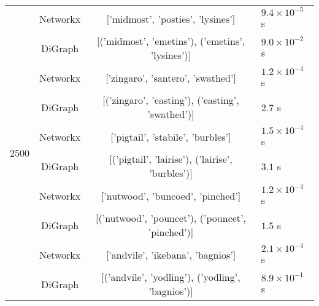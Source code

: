 \documentclass{article}[12 pt]
\begin{document}
\begin{center}
\begin{tabular}{ |c|c|c|l| }
			\multirow{10}{*}{2500} & Networkx & ['midmost', 'posties', 'lysines'] & $9.4\times 10^{-5}$ s\\
			& DiGraph & [('midmost', 'emetins'), ('emetins', 'lysines')] & $9.0\times 10^{-2}$ s\\
			& Networkx & ['zingaro', 'santero', 'swathed'] & $1.2\times 10^{-4}$ s\\
			& DiGraph & [('zingaro', 'easting'), ('easting', 'swathed')] & $2.7$ s\\
			& Networkx & ['pigtail', 'stabile', 'burbles'] & $1.5\times 10^{-4}$ s\\
			& DiGraph & [('pigtail', 'lairise'), ('lairise', 'burbles')] & $3.1$ s\\
			& Networkx & ['nutwood', 'buncoed', 'pinched'] & $1.2\times 10^{-4}$ s\\
			& DiGraph & [('nutwood', 'pouncet'), ('pouncet', 'pinched')] & $1.5$ s\\
			& Networkx & ['andvile', 'ikebana', 'bagnios'] & $2.1\times 10^{-4}$ s\\
			& DiGraph & [('andvile', 'yodling'), ('yodling', 'bagnios')] & $8.9\times 10^{-1}$ s\\
			\hline
		\end{tabular}
	\end{center}
\end{document}
